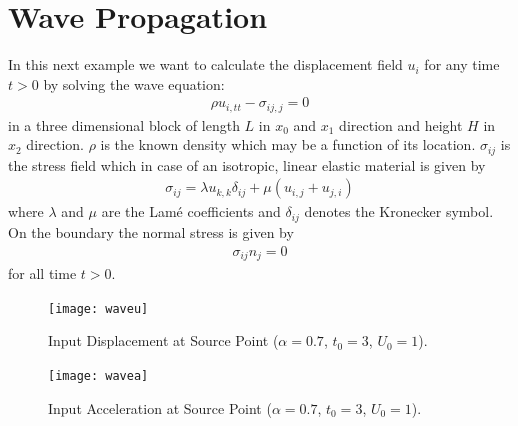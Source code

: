 
%
%
%

\section{Wave Propagation}
\label{WAVE CHAP}

In this next example we want to calculate the displacement field $u_{i}$ for any time $t>0$ by solving the wave equation:
\begin{eqnarray}\label{WAVE general problem}
\rho u_{i,tt} - \sigma_{ij,j}=0
\end{eqnarray}
in a three dimensional block of length $L$ in $x_{0}$
and $x_{1}$ direction and height $H$ in $x_{2}$ direction.
$\rho$ is the known density which may be a function of its location.
$\sigma_{ij}$ is the stress field which in case of an
isotropic, linear elastic material is given by
\begin{eqnarray}\label{WAVE stress}
\sigma_{ij} = \lambda u_{k,k} \delta_{ij} + \mu (u_{i,j} + u_{j,i})
\end{eqnarray}
where $\lambda$ and $\mu$ are the Lam\'e coefficients
and $\delta_{ij}$ denotes the Kronecker symbol.
On the boundary the normal stress is given by
\begin{eqnarray}\label{WAVE natural}
\sigma_{ij}n_{j}=0
\end{eqnarray}
for all time $t>0$.

\begin{figure}[t!]
\centerline{\texttt{[image: waveu]}}
\caption{Input Displacement at Source Point ($\alpha=0.7$, $t_{0}=3$, $U_{0}=1$).}
\label{WAVE FIG 1.2}
\end{figure}

\begin{figure}
\centerline{\texttt{[image: wavea]}}
\caption{Input Acceleration at Source Point ($\alpha=0.7$, $t_{0}=3$, $U_{0}=1$).}
\label{WAVE FIG 1.1}
\end{figure}

